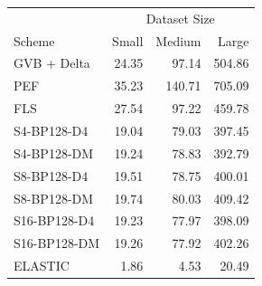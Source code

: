 \begin{tabular}{lrrr}
\toprule
 & \multicolumn{3}{c}{Dataset Size} \\
Scheme & Small & Medium & Large \\
\midrule
GVB + Delta & 24.35 & 97.14 & 504.86 \\
PEF & 35.23 & 140.71 & 705.09 \\
FLS & 27.54 & 97.22 & 459.78 \\
S4-BP128-D4 & 19.04 & 79.03 & 397.45 \\
S4-BP128-DM & 19.24 & 78.83 & 392.79 \\
S8-BP128-D4 & 19.51 & 78.75 & 400.01 \\
S8-BP128-DM & 19.74 & 80.03 & 409.42 \\
S16-BP128-D4 & 19.23 & 77.97 & 398.09 \\
S16-BP128-DM & 19.26 & 77.92 & 402.26 \\
ELASTIC & 1.86 & 4.53 & 20.49 \\
\bottomrule
\end{tabular}
